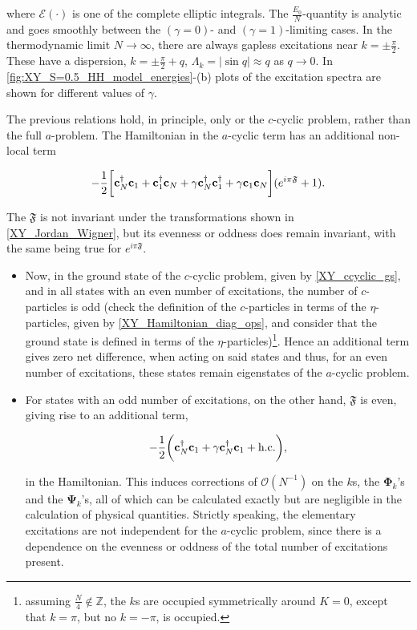 \documentclass{homework}
\begin{document}
where $\mathcal{E}(\cdot)$ is one of the complete elliptic integrals. The $\frac{E_0}{N}$-quantity is analytic and goes smoothly between the $(\gamma=0)$- and $(\gamma=1)$-limiting cases. In the thermodynamic limit $N \rightarrow \infty$, there are always gapless excitations near $k = \pm \frac{\pi}{2}$. These have a dispersion, $k = \pm \frac{\pi}{2} + q$, $\Lambda_k = |\sin q| \approx q$ as $q \rightarrow 0$. In \cref{fig:XY_S=0.5_HH_model_energies}-(b) plots of the excitation spectra are shown for different values of $\gamma$. \\

\begin{tcolorbox}[colback = yellow, title = Physical Context]

The previous relations hold, in principle, only or the $c$-cyclic problem, rather than the full $a$-problem. The Hamiltonian in the $a$-cyclic term has an additional non-local term 

$$
 - \frac{1}{2} \bigg[{\bf c}_N^\dagger {\bf c}_1 + {\bf c}_1^\dagger {\bf c}_N + \gamma {\bf c}_N^\dagger {\bf c}_1^\dagger + \gamma {\bf c}_1 {\bf c}_N\bigg] (e^{i\pi \mathfrak{F}} + 1).
$$

The $\mathfrak{F}$ is not invariant under the transformations shown in \cref{XY_Jordan_Wigner}, but its evenness or oddness does remain invariant, with the same being true for $e^{i\pi \mathfrak{F}}$. 

\begin{itemize}
    \item Now, in the ground state of the $c$-cyclic problem, given by \cref{XY_ccyclic_gs}, and in all states with an even number of excitations, the number of $c$-particles is odd (check the definition of the $c$-particles in terms of the $\eta$-particles, given by \cref{XY_Hamiltonian_diag_ops}, and consider that the ground state is defined in terms of the $\eta$-particles)\footnote{assuming $\frac{N}{4} \notin \mathds{Z}$, the $k$s are occupied symmetrically around $K = 0$, except that $k = \pi$, but no $k= -\pi$, is occupied. }. Hence an additional term gives zero net difference, when acting on said states and thus, for an even number of excitations, these states remain eigenstates of the $a$-cyclic problem. \\
    \item For states with an odd number of excitations, on the other hand, $\mathfrak{F}$ is even, giving rise to an additional term, 
    
    $$
        - \frac{1}{2} \bigg({\bf c}_N^\dagger {\bf c}_1+ \gamma {\bf c}_N^\dagger{\bf c}_1 + \textnormal{h.c.} \bigg),
    $$
    
    in the Hamiltonian. This induces corrections of $\mathcal{O}(N^{-1})$ on the $k$s, the $\bm{\Phi}_k$'s and the $\bm{\Psi}_k$'s, all of which can be calculated exactly but are negligible in the calculation of physical quantities. Strictly speaking, the elementary excitations are not independent for the $a$-cyclic problem, since there is a dependence on the evenness or oddness of the total number of excitations present. 
\end{itemize}

\end{tcolorbox}
\end{document}
